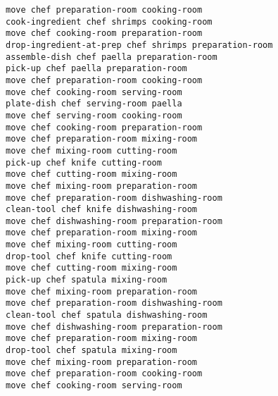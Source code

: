 \documentclass[a4paper,12pt]{article}
\begin{document}
\begin{lstlisting}[language=PDDL, caption=Plan for Problem 3]
move chef preparation-room cooking-room 
cook-ingredient chef shrimps cooking-room 
move chef cooking-room preparation-room 
drop-ingredient-at-prep chef shrimps preparation-room 
assemble-dish chef paella preparation-room 
pick-up chef paella preparation-room 
move chef preparation-room cooking-room 
move chef cooking-room serving-room 
plate-dish chef serving-room paella 
move chef serving-room cooking-room 
move chef cooking-room preparation-room 
move chef preparation-room mixing-room 
move chef mixing-room cutting-room 
pick-up chef knife cutting-room 
move chef cutting-room mixing-room 
move chef mixing-room preparation-room 
move chef preparation-room dishwashing-room 
clean-tool chef knife dishwashing-room 
move chef dishwashing-room preparation-room 
move chef preparation-room mixing-room 
move chef mixing-room cutting-room 
drop-tool chef knife cutting-room 
move chef cutting-room mixing-room 
pick-up chef spatula mixing-room 
move chef mixing-room preparation-room 
move chef preparation-room dishwashing-room 
clean-tool chef spatula dishwashing-room 
move chef dishwashing-room preparation-room 
move chef preparation-room mixing-room 
drop-tool chef spatula mixing-room 
move chef mixing-room preparation-room 
move chef preparation-room cooking-room 
move chef cooking-room serving-room     

\end{lstlisting}
\end{document}
